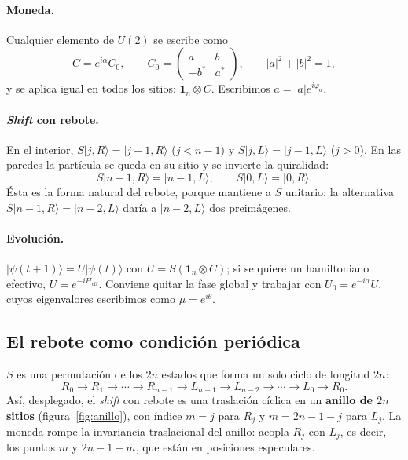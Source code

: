 \documentclass[11pt,a4paper]{article}
\theoremstyle{remark}
\newcommand{\ket}[1]{\lvert #1\rangle}
\newcommand{\one}{\mathbf{1}}
\begin{document}
\paragraph{Moneda.} Cualquier elemento de $U(2)$ se escribe como
\begin{equation}
C=e^{i\alpha}C_0,\qquad
C_0=\begin{pmatrix} a & b\\ -b^* & a^*\end{pmatrix},\qquad |a|^2+|b|^2=1,
\label{eq:moneda}
\end{equation}
y se aplica igual en todos los sitios: $\one_n\otimes C$. Escribimos
$a=|a|e^{i\varphi_a}$.

\paragraph{\emph{Shift} con rebote.} En el interior,
$S\ket{j,R}=\ket{j+1,R}$ ($j<n-1$) y $S\ket{j,L}=\ket{j-1,L}$ ($j>0$). En las
paredes la partícula se queda en su sitio y se invierte la quiralidad:
\begin{equation}
S\ket{n-1,R}=\ket{n-1,L},\qquad S\ket{0,L}=\ket{0,R}.
\end{equation}
Ésta es la forma natural del rebote, porque mantiene a $S$ unitario: la
alternativa $S\ket{n-1,R}=\ket{n-2,L}$ daría a $\ket{n-2,L}$ dos preimágenes.

\paragraph{Evolución.}
$\ket{\psi(t+1)}=U\ket{\psi(t)}$ con $U=S(\one_n\otimes C)$; si se quiere un
hamiltoniano efectivo, $U=e^{-iH_{\text{eff}}}$. Conviene quitar la fase global y
trabajar con $U_0=e^{-i\alpha}U$, cuyos eigenvalores escribimos como
$\mu=e^{i\theta}$.

\subsection{El rebote como condición periódica}

$S$ es una permutación de los $2n$ estados que forma un solo ciclo de longitud $2n$:
\begin{equation}
R_0\to R_1\to\cdots\to R_{n-1}\to L_{n-1}\to L_{n-2}\to\cdots\to L_0\to R_0 .
\end{equation}
Así, desplegado, el \emph{shift} con rebote es una traslación cíclica en un
\textbf{anillo de $2n$ sitios} (figura~\ref{fig:anillo}), con índice $m=j$ para
$R_j$ y $m=2n-1-j$ para $L_j$. La moneda rompe la invariancia traslacional del
anillo: acopla $R_j$ con $L_j$, es decir, los puntos $m$ y $2n-1-m$, que están
en posiciones especulares.
\end{document}
